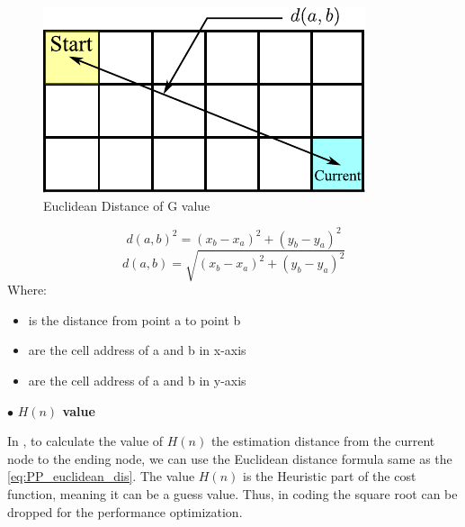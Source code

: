 \begin{figure}[ht]
	\centering
	\includegraphics[scale=1]{images/imagess/6pp-eud-g.pdf}
	\caption{Euclidean Distance of G value}
	\label{fig:Euclidean Distance of G value}
\end{figure}
\begin{equation}
	d(a,b)^2 = (x_b - x_a)^2 + (y_b - y_a)^2
\end{equation}
\begin{equation}\label{eq:PP_euclidean_dis}
	d(a,b) = \sqrt{(x_b - x_a)^2 + (y_b - y_a)^2}
\end{equation}
Where:
\begin{itemize}
	\item { is the distance from point a to point b}
	\item { are the cell address of a and b in x-axis}
	\item { are the cell address of a and b in y-axis}
	
\end{itemize}

\break
$\bullet$ \textbf{$H(n)$ value}\par
\hspace{1.27cm}
In \textbf{\figureautorefname{ \ref{fig:Euclidean Distance of H value}}}, to calculate the value of \(H(n)\) the estimation distance from the current node to the ending node, we can use the Euclidean distance formula same as the \ref{eq:PP_euclidean_dis}. The value \(H(n)\) is the Heuristic part of the cost function, meaning it can be a guess value. Thus, in coding the square root can be dropped for the performance optimization.\par

